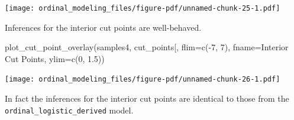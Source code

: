 \documentclass[
  letterpaper,
  DIV=11,
  numbers=noendperiod]{scrartcl}
\newenvironment{Shaded}{\begin{snugshade}}{\end{snugshade}}
\newcommand{\AttributeTok}[1]{\textcolor[rgb]{0.40,0.45,0.13}{#1}}
\newcommand{\DecValTok}[1]{\textcolor[rgb]{0.68,0.00,0.00}{#1}}
\newcommand{\FloatTok}[1]{\textcolor[rgb]{0.68,0.00,0.00}{#1}}
\newcommand{\FunctionTok}[1]{\textcolor[rgb]{0.28,0.35,0.67}{#1}}
\newcommand{\NormalTok}[1]{\textcolor[rgb]{0.00,0.23,0.31}{#1}}
\newcommand{\SpecialCharTok}[1]{\textcolor[rgb]{0.37,0.37,0.37}{#1}}
\newcommand{\StringTok}[1]{\textcolor[rgb]{0.13,0.47,0.30}{#1}}
\begin{document}
\texttt{[image: ordinal\_modeling\_files/figure-pdf/unnamed-chunk-25-1.pdf]}

Inferences for the interior cut points are well-behaved.

\begin{Shaded}
\begin{Highlighting}[]
\FunctionTok{plot\_cut\_point\_overlay}\NormalTok{(samples4, }\StringTok{\textquotesingle{}cut\_points[\textquotesingle{}}\NormalTok{,}
                       \AttributeTok{flim=}\FunctionTok{c}\NormalTok{(}\SpecialCharTok{{-}}\DecValTok{7}\NormalTok{, }\DecValTok{7}\NormalTok{), }\AttributeTok{fname=}\StringTok{\textquotesingle{}Interior Cut Points\textquotesingle{}}\NormalTok{,}
                       \AttributeTok{ylim=}\FunctionTok{c}\NormalTok{(}\DecValTok{0}\NormalTok{, }\FloatTok{1.5}\NormalTok{))}
\end{Highlighting}
\end{Shaded}

\texttt{[image: ordinal\_modeling\_files/figure-pdf/unnamed-chunk-26-1.pdf]}

In fact the inferences for the interior cut points are identical to
those from the \texttt{ordinal\_logistic\_derived} model.
\end{document}
